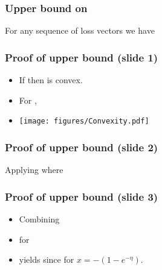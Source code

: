 \documentclass{beamer}
\begin{document}
\begin{frame}
\frametitle{Upper bound on }
\begin{lemma} 
For any sequence of loss vectors 
we have
\end{lemma}
\end{frame}

\begin{frame}
\frametitle{Proof of upper bound (slide 1)}
\begin{itemize}
\item
If  then  is convex.
\item For , 
\item
\texttt{[image: figures/Convexity.pdf]}
\end{itemize}
\end{frame}

\begin{frame}
\frametitle{Proof of upper bound (slide 2)}
Applying  where 
\end{frame}

\begin{frame}
\frametitle{Proof of upper bound (slide 3)}
\begin{itemize}
\item Combining 
\item
for  
\item yields
since  for $x = -(1-e^{-\eta})$.
\end{itemize}
\end{frame}
\end{document}
